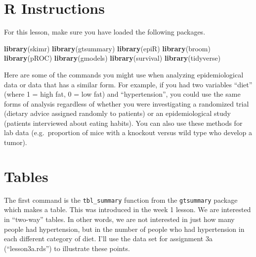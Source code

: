 \documentclass[]{book}
\newenvironment{Shaded}{\begin{snugshade}}{\end{snugshade}}
\newcommand{\DataTypeTok}[1]{\textcolor[rgb]{0.13,0.29,0.53}{#1}}
\newcommand{\KeywordTok}[1]{\textcolor[rgb]{0.13,0.29,0.53}{\textbf{#1}}}
\newcommand{\NormalTok}[1]{#1}
\newcommand{\OperatorTok}[1]{\textcolor[rgb]{0.81,0.36,0.00}{\textbf{#1}}}
\newcommand{\StringTok}[1]{\textcolor[rgb]{0.31,0.60,0.02}{#1}}
\begin{document}
\hypertarget{r-instructions-3}{%
\section{R Instructions}\label{r-instructions-3}}

For this lesson, make sure you have loaded the following packages.

\begin{Shaded}
\begin{Highlighting}[]
\KeywordTok{library}\NormalTok{(skimr)}
\KeywordTok{library}\NormalTok{(gtsummary)}
\KeywordTok{library}\NormalTok{(epiR)}
\KeywordTok{library}\NormalTok{(broom)}
\KeywordTok{library}\NormalTok{(pROC)}
\KeywordTok{library}\NormalTok{(gmodels)}
\KeywordTok{library}\NormalTok{(survival)}
\KeywordTok{library}\NormalTok{(tidyverse)}
\end{Highlighting}
\end{Shaded}

Here are some of the commands you might use when analyzing
epidemiological data or data that has a similar form. For example, if
you had two variables ``diet'' (where 1 = high fat, 0 = low fat) and
``hypertension'', you could use the same forms of analysis regardless of
whether you were investigating a randomized trial (dietary advice
assigned randomly to patients) or an epidemiological study (patients
interviewed about eating habits). You can also use these methods for lab
data (e.g.~proportion of mice with a knockout versus wild type who
develop a tumor).

\hypertarget{tables}{%
\section{Tables}\label{tables}}

The first command is the \texttt{tbl\_summary} function from the
\texttt{gtsummary} package which makes a table. This was introduced in
the week 1 lesson. We are interested in ``two-way'' tables. In other
words, we are not interested in just how many people had hypertension,
but in the number of people who had hypertension in each different
category of diet. I'll use the data set for assignment 3a
(``lesson3a.rds'') to illustrate these points.

\begin{Shaded}
\end{Shaded}
\end{document}
